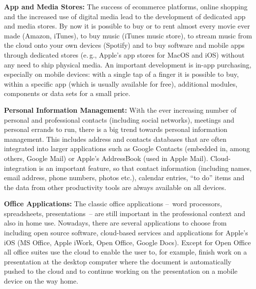 \documentclass[10pt, plain]{../../metanetpaper}
\begin{document}
\begin{multicols}{2}
\textbf{App and Media Stores:} The success of ecommerce platforms, online shopping and the increased use of digital media lead to the development of dedicated app and media stores. By now it is possible to buy or to rent almost every movie ever made (Amazon, iTunes), to buy music (iTunes music store), to stream music from the cloud onto your own devices (Spotify) and to buy software and mobile apps through dedicated stores (e.\,g., Apple's app stores for MacOS and iOS) without any need to ship physical media. An important development is in-app purchasing, especially on mobile devices: with a single tap of a finger it is possible to buy, within a specific app (which is usually available for free), additional modules, components or data sets for a small price.

\textbf{Personal Information Management:} With the ever increasing number of personal and professional contacts (including social networks), meetings and personal errands to run, there is a big trend towards personal information management. This includes address and contacts databases that are often integrated into larger applications such as Google Contacts (embedded in, among others, Google Mail) or Apple's AddressBook (used in Apple Mail). Cloud-integration is an important feature, so that contact information (including names, email address, phone numbers, photos etc.), calendar entries, ``to do'' items and the data from other productivity tools are always available on all devices. 

\textbf{Office Applications:} The classic office applications --~word processors, spreadsheets, presentations~-- are still important in the professional context and also in home use. Nowadays, there are several applications to choose from including open source software, cloud-based services and applications for Apple's iOS (MS Office, Apple iWork, Open Office, Google Docs). Except for Open Office all office suites use the cloud to enable the user to, for example, finish work on a presentation at the desktop computer where the document is automatically pushed to the cloud and to continue working on the presentation on a mobile device on the way home.


\end{multicols}
\end{document}
